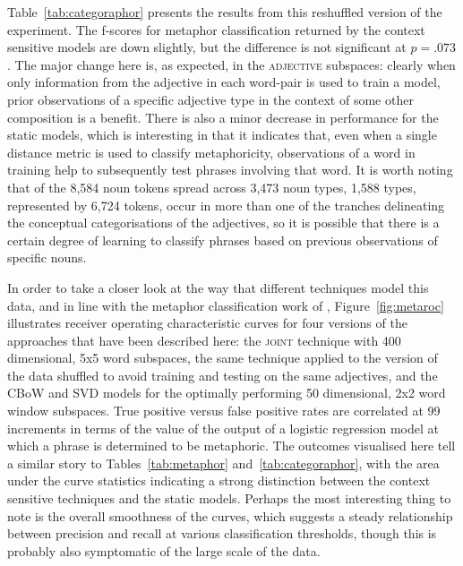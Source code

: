 Table~\ref{tab:categoraphor} presents the results from this reshuffled version of the experiment.  The f-scores for metaphor classification returned by the context sensitive models are down slightly, but the difference is not significant at $p = .073$.  The major change here is, as expected, in the \textsc{adjective} subspaces: clearly when only information from the adjective in each word-pair is used to train a model, prior observations of a specific adjective type in the context of some other composition is a benefit.  There is also a minor decrease in performance for the static models, which is interesting in that it indicates that, even when a single distance metric is used to classify metaphoricity, observations of a word in training help to subsequently test phrases involving that word.  It is worth noting that of the 8,584 noun tokens spread across 3,473 noun types, 1,588 types, represented by 6,724 tokens, occur in more than one of the tranches delineating the conceptual categorisations of the adjectives, so it is possible that there is a certain degree of learning to classify phrases based on previous observations of specific nouns.

In order to take a closer look at the way that different techniques model this data, and in line with the metaphor classification work of \cite{TsvetkovEA2014}, Figure~\ref{fig:metaroc} illustrates receiver operating characteristic curves for four versions of the approaches that have been described here: the \textsc{joint} technique with 400 dimensional, 5x5 word subspaces, the same technique applied to the version of the data shuffled to avoid training and testing on the same adjectives, and the CBoW and SVD models for the optimally performing 50 dimensional, 2x2 word window subspaces.  True positive versus false positive rates are correlated at 99 increments in terms of the value of the output of a logistic regression model at which a phrase is determined to be metaphoric.  The outcomes visualised here tell a similar story to Tables~\ref{tab:metaphor} and~\ref{tab:categoraphor}, with the area under the curve statistics indicating a strong distinction between the context sensitive techniques and the static models.  Perhaps the most interesting thing to note is the overall smoothness of the curves, which suggests a steady relationship between precision and recall at various classification thresholds, though this is probably also symptomatic of the large scale of the data.

